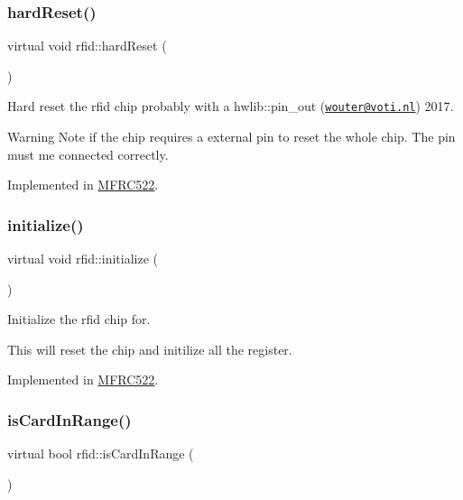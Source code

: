 \subsubsection{\texorpdfstring{hard\+Reset()}{hardReset()}}
{\footnotesize\ttfamily virtual void rfid\+::hard\+Reset (\begin{DoxyParamCaption}{ }\end{DoxyParamCaption})\hspace{0.3cm}{\ttfamily [pure virtual]}}



Hard reset the rfid chip probably with a hwlib\+::pin\+\_\+out (\href{mailto:wouter@voti.nl}{\tt wouter@voti.\+nl}) 2017. 

\begin{DoxyWarning}{Warning}
Note if the chip requires a external pin to reset the whole chip. The pin must me connected correctly. 
\end{DoxyWarning}


Implemented in \mbox{\hyperlink{class_m_f_r_c522_a016df9ed0421397c634cc79c475dbe3b}{M\+F\+R\+C522}}.

\mbox{\label{classrfid_a76f857b77fbea6776048aab6ba835a29}} 
\subsubsection{\texorpdfstring{initialize()}{initialize()}}
{\footnotesize\ttfamily virtual void rfid\+::initialize (\begin{DoxyParamCaption}{ }\end{DoxyParamCaption})\hspace{0.3cm}{\ttfamily [pure virtual]}}



Initialize the rfid chip for. 

This will reset the chip and initilize all the register. 

Implemented in \mbox{\hyperlink{class_m_f_r_c522_a5f589b09eaf150551b369052ce125fa1}{M\+F\+R\+C522}}.

\mbox{\label{classrfid_a23fc4ec0bc3790c5e68269d4f32771b9}} 
\subsubsection{\texorpdfstring{is\+Card\+In\+Range()}{isCardInRange()}}
{\footnotesize\ttfamily virtual bool rfid\+::is\+Card\+In\+Range (\begin{DoxyParamCaption}{ }\end{DoxyParamCaption})\hspace{0.3cm}{\ttfamily [pure virtual]}}



